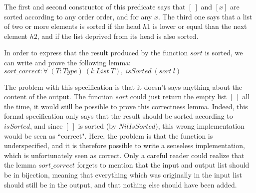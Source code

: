 The first and second constructor of this predicate says that $[\ ]$ and $[x]$ are sorted according to any order order, and for any $x$. The third one says that a list of two or more elements is sorted if the head $h1$ is lower or equal than the next element $h2$, and if the list deprived from its head is also sorted.

In order to express that the result produced by the function $sort$ is sorted, we can write and prove the following lemma:
$sort\_correct : \forall\ (T:Type)\ (l:List\ T),\ isSorted\ (sort\ l)$

The problem with this specification is that it doesn't says anything about the content of the output. The function $sort$ could just return the empty list $[\ ]$ all the time, it would still be possible to prove this correctness lemma. Indeed, this formal specification only says that the result should be sorted according to $isSorted$, and since $[\ ]$ is sorted (by $NilIsSorted$), this wrong implementation would be seen as ``correct". Here, the problem is that the function is underspecified, and it is therefore possible to write a senseless implementation, which is unfortunately seen as correct. Only a careful reader could realize that the lemma $sort\_correct$ forgets to mention that the input and output list should be in bijection, meaning that everything which was originally in the input list should still be in the output, and that nothing else should have been added.

